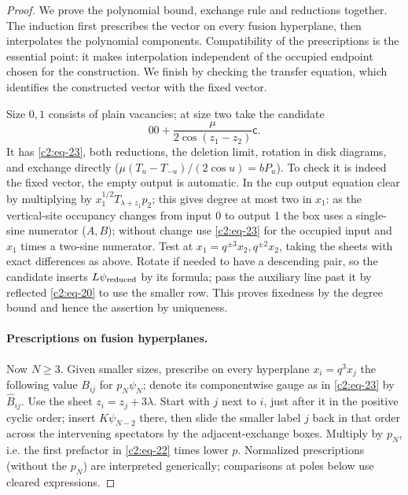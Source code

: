 \begin{proof}
We prove the polynomial bound, exchange rule and reductions together.
The induction first prescribes the vector on every fusion hyperplane,
then interpolates the polynomial components. Compatibility of the
prescriptions is the essential point: it makes interpolation independent
of the occupied endpoint chosen for the construction. We finish by
checking the transfer equation, which identifies the constructed vector
with the fixed vector.

Size \(0,1\) consists of plain vacancies; at size two take the candidate
\[
 00+\frac{\mu}{2\cos(z_1-z_2)}\mathsf c .
\]
It has \eqref{c2:eq-23}, both reductions, the deletion limit, rotation in disk diagrams, and exchange directly (\(\mu(T_u-T_{-u})/(2\cos u)=bP_u\)). To check it is indeed the fixed vector, the empty output is automatic. In the cup output equation clear by multiplying by \(x_1^{1/2}T_{\lambda+z_1}p_2\); this gives degree at most two in \(x_1\): as the vertical-site occupancy changes from input 0 to output 1 the box uses a single-sine numerator (\(A,B\)); without change use \eqref{c2:eq-23} for the occupied input and \(x_1\) times a two-sine numerator. Test at \(x_1=q^{\pm3}x_2,q^{\pm2}x_2\), taking the sheets with exact differences as above. Rotate if needed to have a descending pair, so the candidate inserts \(L\psi_{\rm reduced}\) by its formula; pass the auxiliary line past it by reflected \eqref{c2:eq-20} to use the smaller row. This proves fixedness by the degree bound and hence the assertion by uniqueness.

\paragraph{Prescriptions on fusion hyperplanes.}
Now \(N\ge3\). Given smaller sizes, prescribe on every hyperplane \(x_i=q^3x_j\) the following value \(B_{ij}\) for \(p_N\psi_N\); denote its componentwise gauge as in \eqref{c2:eq-23} by \(\widehat B_{ij}\). Use the sheet \(z_i=z_j+3\lambda\). Start with \(j\) next to \(i\), just after it in the positive cyclic order; insert \(K\psi_{N-2}\) there, then slide the smaller label \(j\) back in that order across the intervening spectators by the adjacent-exchange boxes. Multiply by \(p_N\), i.e. the first prefactor in \eqref{c2:eq-22} times lower \(p\). Normalized prescriptions (without the \(p_N\)) are interpreted generically; comparisons at poles below use cleared expressions.


\end{proof}
